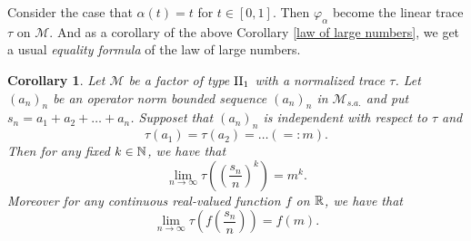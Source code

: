 \documentclass[a4paper,12pt]{amsart}
\newtheorem{corollary}[definition]{Corollary}
\newcommand{\M}{\mathcal{M}}
\begin{document}
Consider the case that $\alpha(t) = t$ for $t \in [0,1]$.  Then $\varphi_{\alpha}$ become the linear trace $\tau$ on $\M$.  
And as a corollary of the above Corollary \ref{law of large numbers}, we get a usual {\it equality formula} of the 
law of large numbers. 

\begin{corollary}
Let $\M$ be a factor of type ${\rm II}_1$ with a normalized trace $\tau$. 
Let $(a_n)_n$ be an operator norm bounded sequence $(a_n)_n$ in ${\M}_{s.a.}$ and 
put $s_n = a_1 + a_2 + \dots +a_n$.
Supposet that $(a_n)_n$ is independent with respect to $\tau$ and 
$$
\tau(a_1) = \tau(a_2) = \dots   (=:m). 
$$
Then for any fixed $k \in {\Bbb N}$, we have that
$$
\lim_{n \rightarrow \infty}  \tau((\frac{s_n}{n})^k) =  m^k. 
$$
Moreover for any continuous real-valued function $f$ on ${\Bbb R}$, 
we have that 
$$
\lim_{n \rightarrow \infty}  \tau(f(\frac{s_n}{n})) =  f(m). 
$$
\end{corollary}
\end{document}
